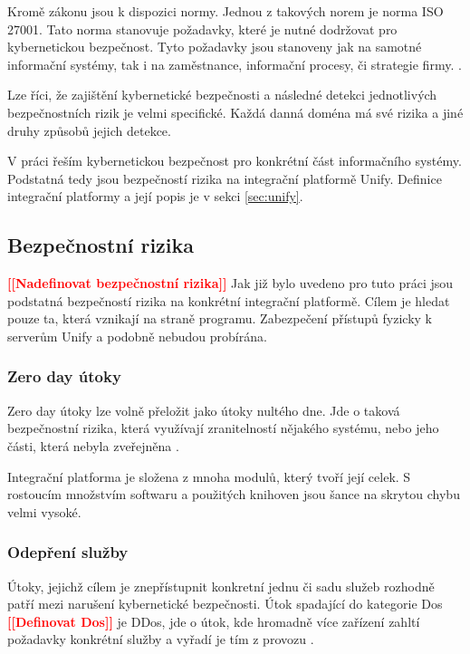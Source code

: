 \documentclass[thesis=M,czech]{FITthesis}[2012/10/20]
\newcommand{\todo}[1]{\textcolor{red}{\textbf{[[#1]]}}}
\begin{document}
		Kromě zákonu jsou k dispozici normy. Jednou z takových norem je norma ISO 27001. Tato norma stanovuje požadavky, které je nutné dodržovat pro kybernetickou bezpečnost. Tyto požadavky jsou stanoveny jak na samotné informační systémy, tak i na zaměstnance, informační procesy, či strategie firmy. \cite{iso27001}.
		
		Lze říci, že zajištění kybernetické bezpečnosti a následné detekci jednotlivých bezpečnostních rizik je velmi specifické. Každá danná doména má své rizika a jiné druhy způsobů jejich detekce. 
		
		V práci řeším kybernetickou bezpečnost pro konkrétní část informačního systémy. Podstatná tedy jsou bezpečností rizika na integrační platformě Unify. Definice integrační platformy a její popis je v sekci \ref{sec:unify}.
		
		\subsection{Bezpečnostní rizika}
		\todo{Nadefinovat bezpečnostní rizika}
			Jak již bylo uvedeno pro tuto práci jsou podstatná bezpečností rizika na konkrétní integrační platformě. Cílem je hledat pouze ta, která vznikají na straně programu. Zabezpečení přístupů fyzicky k serverům Unify a podobně nebudou probírána.
			
			\subsubsection{Zero day útoky}
				Zero day útoky lze volně přeložit jako útoky nultého dne.
				Jde o taková bezpečnostní rizika, která využívají zranitelností nějakého systému, nebo jeho části, která nebyla zveřejněna \cite{investigationZ0}.
				
				Integrační platforma je složena z mnoha modulů, který tvoří její celek. S rostoucím množstvím softwaru a použitých knihoven jsou šance na skrytou chybu velmi vysoké. 
			
			\subsubsection{Odepření služby}
				Útoky, jejichž cílem je znepřístupnit konkretní jednu či sadu služeb rozhodně patří mezi narušení kybernetické bezpečnosti. Útok spadající do kategorie Dos \todo{Definovat Dos} je DDos, jde o útok, kde hromadně více zařízení zahltí požadavky konkrétní služby a vyřadí je tím z provozu \cite{dosAndDdos}.
				
\end{document}
